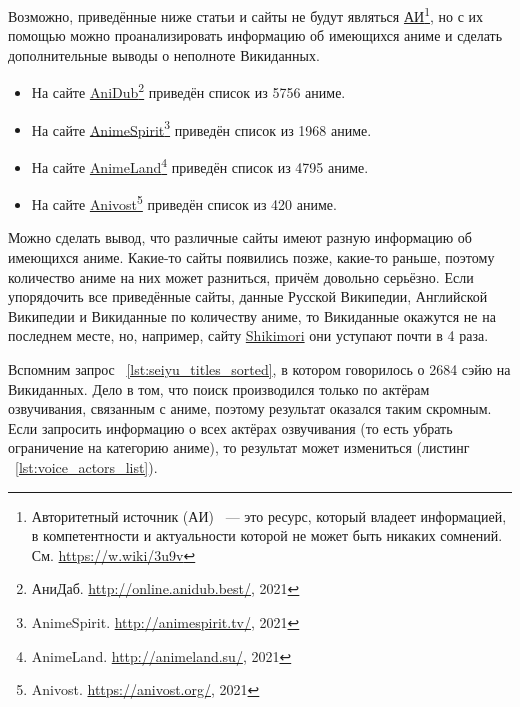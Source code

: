 Возможно, приведённые ниже статьи и сайты не будут являться \href{https://w.wiki/3u9v}{АИ}\footnote{Авторитетный источник (АИ) ~--- это ресурс, который владеет информацией, в компетентности и актуальности которой не может быть никаких сомнений. См. \href{https://w.wiki/3u9v}{https://w.wiki/3u9v}}, но с их помощью можно проанализировать информацию об имеющихся аниме и сделать дополнительные выводы о неполноте Викиданных.

\begin{itemize}
	\item На сайте \href{http://online.anidub.best/}{AniDub}\footnote{АниДаб. \href{http://online.anidub.best/}{http://online.anidub.best/}, 2021} приведён список из \num{5756} аниме.
	\item На сайте \href{http://animespirit.tv/}{AnimeSpirit}\footnote{AnimeSpirit. \href{http://animespirit.tv/}{http://animespirit.tv/}, 2021} приведён список из \num{1968} аниме.
	\item На сайте \href{http://animeland.su/}{AnimeLand}\footnote{AnimeLand. \href{http://animeland.su/}{http://animeland.su/}, 2021} приведён список из \num{4795} аниме.
	\item На сайте \href{https://anivost.org/}{Anivost}\footnote{Anivost. \href{https://anivost.org/}{https://anivost.org/}, 2021} приведён список из \num{420} аниме.
\end{itemize}

Можно сделать вывод, что различные сайты имеют разную информацию об имеющихся аниме. Какие-то сайты появились позже, какие-то раньше, поэтому количество аниме на них может разниться, причём довольно серьёзно. Если упорядочить все приведённые сайты, данные Русской Википедии, Английской Википедии и Викиданные по количеству аниме, то Викиданные окажутся не на последнем месте, но, например, сайту \href{https://shikimori.one/}{Shikimori}\cite{shikimori} они уступают почти в 4 раза.

Вспомним запрос ~\protect\ref{lst:seiyu_titles_sorted}, в котором говорилось о \num{2684} сэйю на Викиданных. Дело в том, что поиск производился только по актёрам озвучивания, связанным с аниме, поэтому результат оказался таким скромным. Если запросить информацию о всех актёрах озвучивания (то есть убрать ограничение на категорию аниме), то результат может измениться (листинг ~\protect\ref{lst:voice_actors_list}). 


